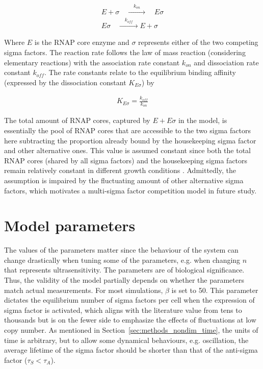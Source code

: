 \begin{gather}
    E + \sigma \quad \xrightarrow{\quad k_{on} \quad} \quad E\sigma\\
    E\sigma \quad \xrightarrow{\quad k_{off} \quad} E + \sigma
\end{gather}

Where $E$ is the RNAP core enzyme and $\sigma$ represents
either of the two competing sigma factors.
The reaction rate follows the law of mass reaction (considering
elementary reactions) with the association rate constant $k_{on}$ and
dissociation rate constant $k_{off}$.
The rate constants relate to the equilibrium binding affinity 
(expressed by the dissociation constant $K_{E\sigma}$) by
\cite{john12}

\begin{align}
    \label{eqn:disso_constant_to_rates}
    K_{E\sigma} = \frac{k_{off}}{k_{on}}
\end{align}

The total amount of RNAP cores, captured by $E + E\sigma$
in the model, is essentially the pool of RNAP cores that
are accessible to the two sigma factors here subtracting
the proportion already bound by the housekeeping sigma factor and
other alternative ones.
This value is assumed constant since both the total 
RNAP cores (shared by all sigma factors) and the housekeeping
sigma factors remain relatively constant in different
growth conditions \cite{osterberg11}.
Admittedly, the assumption is impaired by the fluctuating 
amount of other alternative sigma factors, 
which motivates a multi-sigma factor competition model in
future study.


\section{Model parameters}

The values of the parameters matter since the behaviour of the system
can change drastically when tuning some of the parameters,
e.g. when changing $n$ that represents ultrasensitivity.
The parameters are of biological significance.
Thus, the validity of the model partially depends on whether
the parameters match actual measurements.
For most simulations, $\beta$ is set to 50.
This parameter dictates the equilibrium number of sigma factors
per cell when the expression of sigma factor is activated,
which aligns with the literature value from tens to thousands
\cite{collinet00,mauri14} but is on the fewer side to emphasize
the effects of fluctuations at low copy number.
As mentioned in Section~\ref{sec:methods_nondim_time},
the units of time is arbitrary, but to allow some dynamical behaviours,
e.g. oscillation, the average lifetime of the sigma factor should
be shorter than that of the anti-sigma factor ($\tau_S < \tau_A$).

